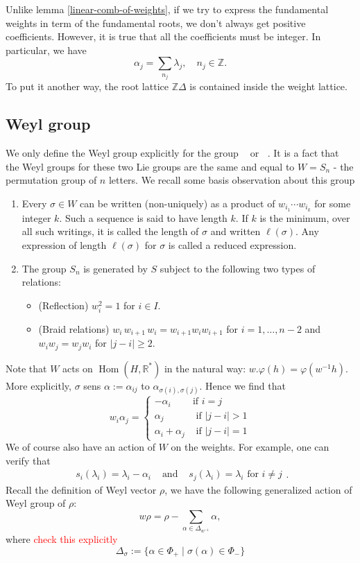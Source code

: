 \documentclass[12pt]{article} %
\DeclareMathOperator{\SLn}{\text{SL}_n(\mathbb{R})}
\DeclareMathOperator{\GLn}{\text{GL}_n(\mathbb{R})}
\DeclareMathOperator{\Hom}{Hom}
\begin{document}
Unlike lemma \ref{linear-comb-of-weights}, if we try to express the fundamental weights in term of the fundamental roots, we don't always
get positive coefficients. However, it is true that all the coefficients must be integer. In particular, we have
\[\alpha_j = \sum_{n_j}\lambda_j, \quad n_j \in \mathbb{Z}.\]
To put it another way, the root lattice $\mathbb{Z}\Delta$ is contained inside the weight lattice.
\subsection{Weyl group}
We only define the Weyl group explicitly for the group $\SLn$ or $\GLn$. It is a fact that the Weyl groups for
these two Lie groups are the same and equal to $W = S_n$ - the permutation group of $n$ letters.  We recall some basis
observation about this group
\begin{enumerate}
    \item Every $\sigma \in W$ can be written (non-uniquely) as a product of $w_{i_1} \cdots w_{i_k}$ for some integer $k$. Such a sequence is said to have length $k.$ If $k$ is the minimum, over all such writings, it is called the length of $\sigma$ and written $\ell(\sigma)$. Any expression of length $\ell(\sigma)$ for $\sigma$ is called a reduced expression.

    \item The group $S_n$ is generated by $S$ subject to the following two types of relations:
          \begin{itemize}
              \item (Reflection) $w_i^2=1$ for $i \in I$.
              \item (Braid relations) $w_i \, w_{i+1} \, w_i = w_{i+1}w_i w_{i+1}$ for $i = 1, \ldots, n-2$ and $w_i w_j = w_j w_i$ for $|j -i |\geq 2$.
          \end{itemize}
\end{enumerate}
Note that $W$ acts on $\Hom(H, \mathbb{R}^*)$ in the natural way: $w . \varphi(h) = \varphi(w^{-1} h)$. More explicitly,  $\sigma$ sens $\alpha:= \alpha_{ij}$ to $\alpha_{\sigma(i), \sigma(j)}$. Hence we find that
\[w_i \alpha_j = \begin{cases} - \alpha_i          & \mbox{if } i=j           \\
              \alpha_j            & \mbox{ if } |j - i | > 1 \\
              \alpha_i + \alpha_j & \mbox{ if } |j-i|=1\end{cases} \]
We of course also have an action of $W$ on the weights.  For example, one can verify that
\[ \begin{array}{lcr} s_i(\lambda_i) = \lambda_i - \alpha_i & \text{ and } & s_j(\lambda_i) = \lambda_i \mbox{ for } i \neq j \end{array}.\]
Recall the definition of Weyl vector $\rho$, we have the following generalized action of Weyl group of $\rho$:
\[ w \rho = \rho - \sum_{\alpha \in \Delta_{w^{-1}}} \alpha,\]
where \textcolor{red}{check this explicitly}
\[\Delta_{\sigma}:= \{ \alpha \in \Phi_+ \mid \sigma(\alpha) \in \Phi_- \}\]
\end{document}
